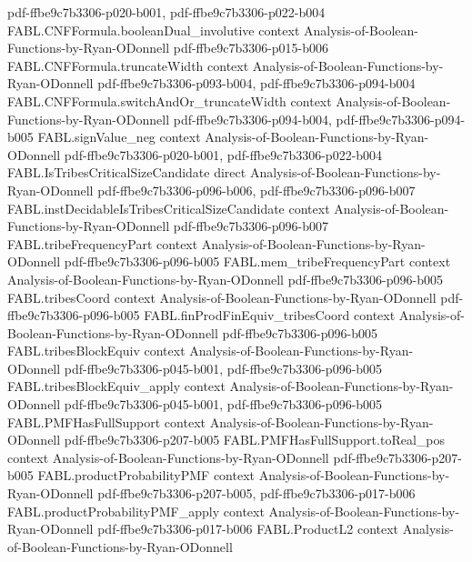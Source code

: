 \begin{theorem}
  {pdf-ffbe9c7b3306-p020-b001,
    pdf-ffbe9c7b3306-p022-b004}
\proofstep
  {FABL.CNFFormula.booleanDual_involutive}
  {context}
  {Analysis-of-Boolean-Functions-by-Ryan-ODonnell}
  {pdf-ffbe9c7b3306-p015-b006}
\proofstep
  {FABL.CNFFormula.truncateWidth}
  {context}
  {Analysis-of-Boolean-Functions-by-Ryan-ODonnell}
  {pdf-ffbe9c7b3306-p093-b004,
    pdf-ffbe9c7b3306-p094-b004}
\proofstep
  {FABL.CNFFormula.switchAndOr_truncateWidth}
  {context}
  {Analysis-of-Boolean-Functions-by-Ryan-ODonnell}
  {pdf-ffbe9c7b3306-p094-b004,
    pdf-ffbe9c7b3306-p094-b005}
\proofstep
  {FABL.signValue_neg}
  {context}
  {Analysis-of-Boolean-Functions-by-Ryan-ODonnell}
  {pdf-ffbe9c7b3306-p020-b001,
    pdf-ffbe9c7b3306-p022-b004}
\proofstep
  {FABL.IsTribesCriticalSizeCandidate}
  {direct}
  {Analysis-of-Boolean-Functions-by-Ryan-ODonnell}
  {pdf-ffbe9c7b3306-p096-b006,
    pdf-ffbe9c7b3306-p096-b007}
\proofstep
  {FABL.instDecidableIsTribesCriticalSizeCandidate}
  {context}
  {Analysis-of-Boolean-Functions-by-Ryan-ODonnell}
  {pdf-ffbe9c7b3306-p096-b007}
\proofstep
  {FABL.tribeFrequencyPart}
  {context}
  {Analysis-of-Boolean-Functions-by-Ryan-ODonnell}
  {pdf-ffbe9c7b3306-p096-b005}
\proofstep
  {FABL.mem_tribeFrequencyPart}
  {context}
  {Analysis-of-Boolean-Functions-by-Ryan-ODonnell}
  {pdf-ffbe9c7b3306-p096-b005}
\proofstep
  {FABL.tribesCoord}
  {context}
  {Analysis-of-Boolean-Functions-by-Ryan-ODonnell}
  {pdf-ffbe9c7b3306-p096-b005}
\proofstep
  {FABL.finProdFinEquiv_tribesCoord}
  {context}
  {Analysis-of-Boolean-Functions-by-Ryan-ODonnell}
  {pdf-ffbe9c7b3306-p096-b005}
\proofstep
  {FABL.tribesBlockEquiv}
  {context}
  {Analysis-of-Boolean-Functions-by-Ryan-ODonnell}
  {pdf-ffbe9c7b3306-p045-b001,
    pdf-ffbe9c7b3306-p096-b005}
\proofstep
  {FABL.tribesBlockEquiv_apply}
  {context}
  {Analysis-of-Boolean-Functions-by-Ryan-ODonnell}
  {pdf-ffbe9c7b3306-p045-b001,
    pdf-ffbe9c7b3306-p096-b005}
\proofstep
  {FABL.PMFHasFullSupport}
  {context}
  {Analysis-of-Boolean-Functions-by-Ryan-ODonnell}
  {pdf-ffbe9c7b3306-p207-b005}
\proofstep
  {FABL.PMFHasFullSupport.toReal_pos}
  {context}
  {Analysis-of-Boolean-Functions-by-Ryan-ODonnell}
  {pdf-ffbe9c7b3306-p207-b005}
\proofstep
  {FABL.productProbabilityPMF}
  {context}
  {Analysis-of-Boolean-Functions-by-Ryan-ODonnell}
  {pdf-ffbe9c7b3306-p207-b005,
    pdf-ffbe9c7b3306-p017-b006}
\proofstep
  {FABL.productProbabilityPMF_apply}
  {context}
  {Analysis-of-Boolean-Functions-by-Ryan-ODonnell}
  {pdf-ffbe9c7b3306-p017-b006}
\proofstep
  {FABL.ProductL2}
  {context}
  {Analysis-of-Boolean-Functions-by-Ryan-ODonnell}

\end{theorem}

